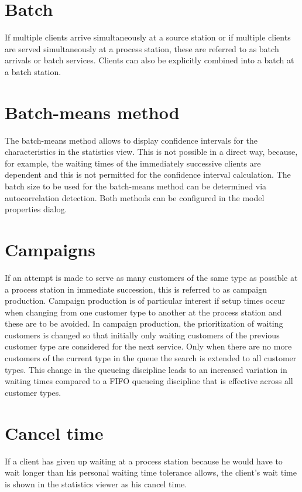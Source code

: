 \section*{Batch}


If multiple clients arrive simultaneously at a source station or if multiple clients are served
simultaneously at a process station, these are referred to as batch arrivals or batch services.
Clients can also be explicitly combined into a batch at a batch station.

\section*{Batch-means method}


The batch-means method allows to display confidence intervals for the characteristics in the statistics view.
This is not possible in a direct way, because, for example, the waiting times of the immediately successive clients are dependent and this is
not permitted for the confidence interval calculation. The batch size to be used for the batch-means method can be determined via autocorrelation
detection. Both methods can be configured in the model properties dialog.

\section*{Campaigns}


If an attempt is made to serve as many customers of the same type as possible at a process station
in immediate succession, this is referred to as campaign production. Campaign production is of particular interest if setup times occur
when changing from one customer type to another at the process station and these are to be avoided. In campaign production,
the prioritization of waiting customers is changed so that initially only waiting customers of the previous customer type are considered
for the next service. Only when there are no more customers of the current type in the queue the search is extended to all customer types.
This change in the queueing discipline leads to an increased variation in waiting times compared to a FIFO queueing discipline that
is effective across all customer types.

\section*{Cancel time}


If a client has given up waiting at a process station because he would have to wait longer
than his personal waiting time tolerance allows, the client's wait time is shown in the statistics viewer
as his cancel time.

